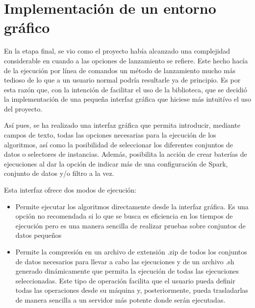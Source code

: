 
\section{Implementación de un entorno gráfico}

En la etapa final, se vio como el proyecto había alcanzado una complejidad considerable en cuando a las opciones de lanzamiento se refiere. Este hecho hacía de la ejecución por línea de comandos un método de lanzamiento mucho más tedioso de lo que a un usuario normal podría resultarle ya de principio. Es por esta razón que, con la intención de facilitar el uso de la biblioteca, que se decidió la implementación de una pequeña interfaz gráfica que hiciese más intuitívo el uso del proyecto.

Así pues, se ha realizado una interfaz gráfica que permita introducir, mediante campos de texto, todas las opciones necesarias para la ejecución de los algoritmos, así como la posibilidad de seleccionar los diferentes conjuntos de datos o selectores de instancias. Además, posibilita la acción de crear baterías de ejecuciones al dar la opción de indicar más de una configuración de Spark, conjunto de datos y/o filtro a la vez.

Esta interfaz ofrece dos modos de ejecución:

\begin{itemize}
\item Permite ejecutar los algoritmos directamente desde la interfaz gráfica. Es una opción no recomendada si lo que se busca es eficiencia en los tiempos de ejecución pero es una manera sencilla de realizar pruebas sobre conjuntos de datos pequeños
\item Permite la compresión en un archivo de extensión .zip de todos los conjuntos de datos necesarios para llevar a cabo las ejecuciones y de un archivo .sh generado dinámicamente que permita la ejecución de todas las ejecuciones seleccionadas. Este tipo de operación facilita que el usuario pueda definir todas las operaciones desde su máquina y, posteriormente, pueda trasladarlas de manera sencilla a un servidor más potente donde serán ejecutadas.
\end{itemize}





